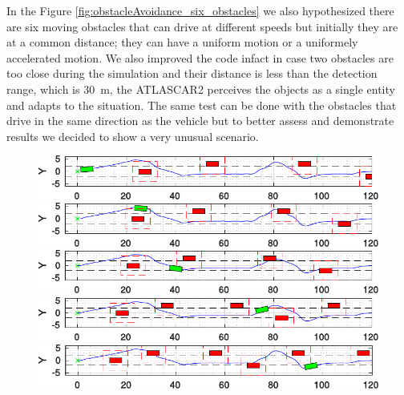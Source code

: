 In the Figure \ref{fig:obstacleAvoidance_six_obstacles} we also hypothesized there are six moving obstacles that can drive at different speeds but initially they are at a common distance; they can have a uniform motion or a uniformely accelerated motion. We also improved the code infact in case two obstacles are too close during the simulation and their distance is less than the detection range, which is \SI{30}{m}, the ATLASCAR2 perceives the objects as a single entity and adapts to the situation. The same test can be done with the obstacles that drive in the same direction as the vehicle but to better assess and demonstrate results we decided to show a very unusual scenario. 
\begin{figure}[b!]
	\centering
	\begin{minipage}[t]{\textwidth}
		\includegraphics[width=\textwidth]{./figure/6_obstacles/6_obstacles_1.pdf}
	\end{minipage}
	\begin{minipage}[t]{\textwidth}
		\includegraphics[width=\textwidth]{./figure/6_obstacles/6_obstacles_2.pdf}
	\end{minipage}
	\begin{minipage}[t]{\textwidth}
		\includegraphics[width=\textwidth]{./figure/6_obstacles/6_obstacles_3.pdf}
	\end{minipage}
	\begin{minipage}[t]{\textwidth}
		\includegraphics[width=\textwidth]{./figure/6_obstacles/6_obstacles_4.pdf}
	\end{minipage}
	\begin{minipage}[t]{\textwidth}
		\includegraphics[width=\textwidth]{./figure/6_obstacles/6_obstacles_5.pdf}

\end{minipage}
\end{figure}
